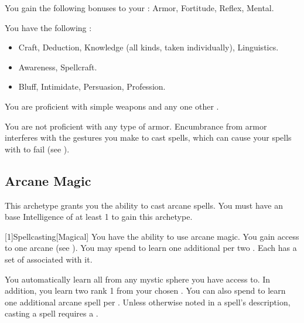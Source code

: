        You gain the following bonuses to your :  Armor,  Fortitude,  Reflex,  Mental.

        You have the following :
        \begin{itemize}
            \item {} Craft, Deduction, Knowledge (all kinds, taken individually), Linguistics.
            \item {} Awareness, Spellcraft.
            \item {} Bluff, Intimidate, Persuasion, Profession.
        \end{itemize}

        You are proficient with simple weapons and any one other .

        You are not proficient with any type of armor.
        Encumbrance from armor interferes with the gestures you make to cast spells, which can cause your spells with  to fail (see ).

    \subsection{Arcane Magic}
        This archetype grants you the ability to cast arcane spells.
        You must have an base Intelligence of at least 1 to gain this archetype.

        [1]{Spellcasting}[Magical]
        You have the ability to use arcane magic.
        You gain access to one arcane  (see ).
        You may spend  to learn one additional  per two .
        Each  has a set of  associated with it.

        You automatically learn all  from any mystic sphere you have access to.
        In addition, you learn two rank 1  from your chosen .
        You can also spend  to learn one additional arcane spell per .
        Unless otherwise noted in a spell's description, casting a spell requires a .

